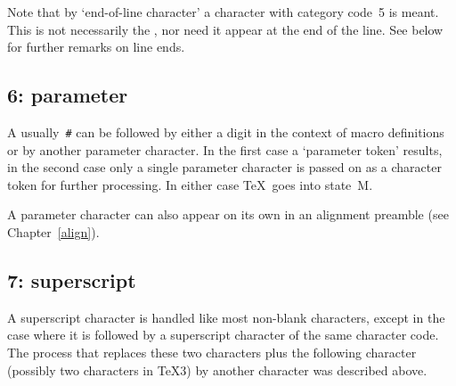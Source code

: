 \documentclass{book}
\begin{document}
Note that by `end-of-line character' a character with category
code~5 is meant. This is not necessarily the ,
nor need it appear at the end of the line.
See below for further remarks on line ends.

\subsection{6: parameter}

A  \ldash usually~\verb=#= \rdash  can be
followed by either a digit  
in the context of macro definitions
\altt
or by another parameter character. 
In the first case a `parameter token' results,
in the second case only a single parameter character
is passed on as a character token for further processing.
In either case \TeX\ goes into state~{\italic M}.

A parameter character can also appear on its own in an
alignment preamble (see Chapter~\ref{align}).

\subsection{7: superscript}

A superscript character is handled like most non-blank
characters, except in the case where it is followed
by a  superscript character of the same character code.
The process
that replaces these two characters plus the following character
(possibly two characters in \TeX3) by another character
was described above.
\end{document}
